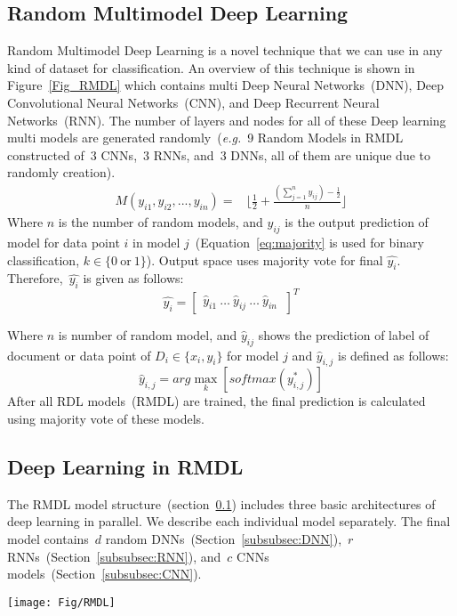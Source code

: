 \documentclass[sigconf, final]{acmart}
\begin{document}
\subsection{Random Multimodel Deep Learning}\label{subsect:RMDL}
Random Multimodel Deep Learning is a novel technique that we can use in any kind of dataset for classification. An overview of this technique is shown in Figure~\ref{Fig_RMDL} which contains multi Deep Neural Networks~(DNN), Deep Convolutional Neural Networks~(CNN), and Deep Recurrent Neural Networks~(RNN). The number of layers and nodes for all of these Deep learning multi models are generated randomly~(\textit{e.g.}~9 Random Models in RMDL constructed of~$3$ CNNs,~$3$ RNNs, and~$3$ DNNs, all of them are unique due to randomly creation). 
\begin{align}
\label{eq:majority}
M(y_{i1},y_{i2},...,y_{in}) =& \bigg\lfloor \frac{1}{2}+ \frac{(\sum_{j=1}^n y_{ij}) - \frac{1}{2}}{n}\bigg\rfloor \end{align}
Where $n$ is the number of random models, and $y_{ij}$ is the output prediction of model for data point $i$ in  model $j$~(Equation~\ref{eq:majority} is used for binary classification, $k\in\{0~ \text{or}~1\}$). Output space uses majority vote for final $\hat{y_i}$. Therefore,~$\hat{y_i}$ is given as follows:
\begin{equation}
\hat{y_i} =  
\begin{bmatrix}
\hat{y}_{i1} ~
\hdots ~
\hat{y}_{ij}~
\hdots~
\hat{y}_{in}~
\end{bmatrix}^T
\end{equation} 

Where $n$ is number of random model, and $\hat{y}_{ij}$ shows the prediction of label of document or data point of $D_i \in \{x_i,y_i\}$ for model $j$ and $\hat{y}_{i,j}$ is defined as follows:
\begin{equation}
\hat{y}_{i,j} = arg \max_{k} [ softmax(y_{i,j}^*)]
\end{equation}
After all RDL models~(RMDL) are trained, the final prediction is calculated using majority vote of these models. 


\subsection{Deep Learning in RMDL}\label{subsec:Deep_learning}
The RMDL model structure~(section~\ref{subsect:RMDL}) includes three basic architectures of deep learning in parallel. We describe each individual model separately. The final model contains~$d$ random DNNs~(Section~\ref{subsubsec:DNN}),~$r$ RNNs~(Section~\ref{subsubsec:RNN}), and~$c$ CNNs models~(Section~\ref{subsubsec:CNN}).
\begin{figure*}[t]
\centering
\texttt{[image: Fig/RMDL]}
\caption{\underline{R}andom \underline{M}ultimodel \underline{D}eep \underline{L}earning~(RDML) architecture for classification which includes~$3$ Random models, a DNN classifier at left, a Deep CNN classifier at middle, and a Deep RNN classifier at right~(each unit could be LSTM or GRU).}
\vspace{-0.15in}
\label{Fig_RMDL}

\end{figure*}
\end{document}
